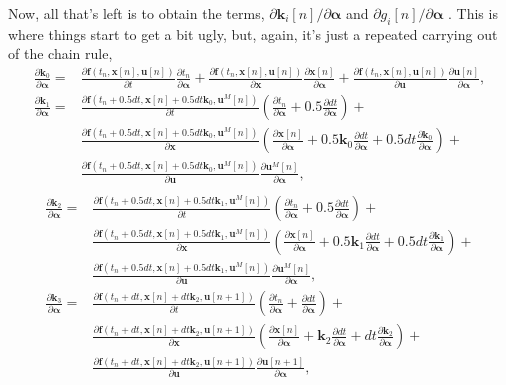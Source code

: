 \documentclass[onecolumn,11pt]{article}
\newcommand{\bs}{\boldsymbol}
\begin{document}
Now, all that's left is to obtain the terms, $  {\partial \bs k_i[n]}/{\partial \bs \alpha}$ and $  {\partial g_i[n]}/{\partial \bs \alpha}$ . This is where things start to get a bit ugly, but, again, it's just a repeated carrying out of the chain rule,
\begin{equation*}
\begin{split}
\frac{\partial \bs k_0}{\partial \bs \alpha} =& \frac{\partial \bs f(t_n,\bs x[n], \bs u[n])}{\partial t}\frac{\partial t_n}{\partial \bs \alpha} + \frac{\partial \bs f(t_n,\bs x[n], \bs u[n])}{\partial \bs x}\frac{\partial \bs x[n]}{\partial \bs \alpha}  + \frac{\partial \bs f(t_n,\bs x[n], \bs u[n])}{\partial \bs u}\frac{\partial \bs u [n]}{\partial \bs \alpha},
\\[2ex]
\frac{\partial \bs k_1}{\partial \bs \alpha} =& \frac{\partial \bs f(t_n+0.5dt,\bs x[n]+0.5dt \bs k_0,\bs u^M[n])}{\partial t} \left( \frac{\partial t_n}{\partial \bs \alpha} + 0.5\frac{\partial dt}{\partial \bs \alpha}  \right)+\\
& \frac{\partial \bs f(t_n+0.5dt,\bs x[n]+0.5dt \bs k_0,\bs u^M[n])}{\partial \bs x} \left( \frac{\partial \bs x[n]}{\partial \bs \alpha} + 0.5\bs k_0\frac{\partial dt}{\partial \bs \alpha} + 0.5dt\frac{\partial \bs k_0}{\partial \bs \alpha}  \right) +\\
&  \frac{\partial \bs f(t_n+0.5dt,\bs x[n]+0.5dt \bs k_0,\bs u^M[n])}{\partial \bs u}\frac{\partial \bs u^M[n]}{\partial \bs \alpha},
\\
\end{split}
\end{equation*}
\begin{equation*}
\begin{split}
\frac{\partial \bs k_2}{\partial \bs \alpha} =& \frac{\partial \bs f(t_n+0.5dt,\bs x[n]+0.5dt \bs k_1,\bs u^M[n])}{\partial t} \left( \frac{\partial t_n}{\partial \bs \alpha} + 0.5\frac{\partial dt}{\partial \bs \alpha}  \right)+\\
& \frac{\partial \bs f(t_n+0.5dt,\bs x[n]+0.5dt \bs k_1,\bs u^M[n])}{\partial \bs x} \left( \frac{\partial \bs x[n]}{\partial \bs \alpha} + 0.5\bs k_1\frac{\partial dt}{\partial \bs \alpha} + 0.5dt\frac{\partial \bs k_1}{\partial \bs \alpha}  \right) +\\
&  \frac{\partial \bs f(t_n+0.5dt,\bs x[n]+0.5dt \bs k_1,\bs u^M[n])}{\partial \bs u}\frac{\partial \bs u^M[n]}{\partial \bs \alpha},
\\[2ex]
\frac{\partial \bs k_3}{\partial \bs \alpha} =& \frac{\partial \bs f(t_n+dt,\bs x[n]+dt \bs k_2,\bs u[n+1])}{\partial t} \left( \frac{\partial t_n}{\partial \bs \alpha} + \frac{\partial dt}{\partial \bs \alpha}  \right)+\\
& \frac{\partial \bs f(t_n+dt,\bs x[n]+dt \bs k_2,\bs u[n+1])}{\partial \bs x} \left( \frac{\partial \bs x[n]}{\partial \bs \alpha} + \bs k_2\frac{\partial dt}{\partial \bs \alpha} + dt\frac{\partial \bs k_2}{\partial \bs \alpha}  \right) +\\
&  \frac{\partial \bs f(t_n+dt,\bs x[n]+dt \bs k_2,\bs u[n+1])}{\partial \bs u}\frac{\partial \bs u[n+1]}{\partial \bs \alpha},
\\[1ex]
\end{split}
\end{equation*}
\end{document}
